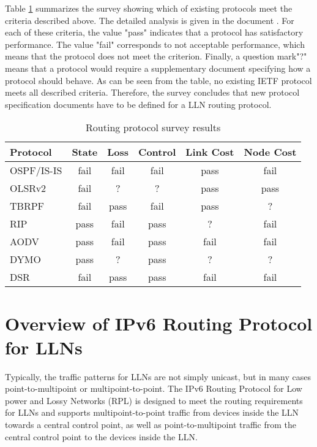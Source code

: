 Table \ref{table:routing.prot.survey} summarizes the survey showing which of existing protocols meet the criteria described above. The detailed analysis is given in the document \cite{draft-protocols-07}. For each of these criteria, the value "pass" indicates that a protocol has satisfactory performance.  The value "fail" corresponds to not acceptable performance, which means that the protocol does not meet the criterion. Finally, a question mark"?" means that a protocol would require a supplementary document specifying how a protocol should behave. As can be seen from the table, no existing IETF protocol meets all described criteria. Therefore, the survey concludes that new protocol specification documents have to be defined for a LLN routing protocol.


\begin{table}[htp]
\begin{center}
        \begin{tabular}{|l|c|c|c|c|c|}
          \hline
          Protocol   &   State &  Loss & Control &  Link Cost & Node Cost\\
          \hline
          \hline
     OSPF/IS-IS  &  fail  &  fail  &  fail   &   pass    &   fail\\
     OLSRv2      &  fail  &   ?    &   ?     &   pass    &   pass\\
     TBRPF       &  fail  &  pass  &  fail   &   pass    &    ?\\
     RIP         &  pass  &  fail  &  pass   &    ?      &   fail\\
     AODV        &  pass  &  fail  &  pass   &   fail    &   fail\\
     DYMO        &  pass  &   ?    &  pass   &    ?      &    ?\\
     DSR         &  fail  &  pass  &  pass   &   fail    &   fail\\
          \hline
        \end{tabular}
\end{center}
\caption{Routing protocol survey results}\label{table:routing.prot.survey}
\end{table}


\section{Overview of IPv6 Routing Protocol for LLNs}\label{sec:rout.rpl}
Typically, the traffic patterns for LLNs are not simply unicast, but in many cases point-to-multipoint or multipoint-to-point. The IPv6 Routing Protocol for Low power and Lossy Networks (RPL) \cite{draft-rpl-04} is designed to meet the routing requirements for LLNs and supports multipoint-to-point traffic from devices inside the LLN towards a central control point, as well as point-to-multipoint traffic from the central control point to the devices inside the LLN. 

